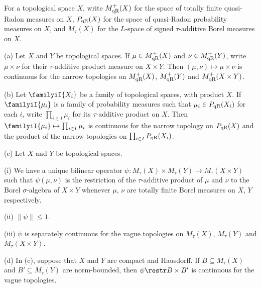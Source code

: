  For a topological space
$X$, write $M^+_{\text{qR}}(X)$ for the space of totally finite quasi-Radon
measures on $X$, $P_{\text{qR}}(X)$ for the space of quasi-Radon probability
measures on $X$, and $M_{\tau}(X)$ for the
$L$-space of signed $\tau$-additive Borel measures on $X$.

(a) Let $X$ and $Y$ be topological spaces.   If
$\mu\in M^+_{\text{qR}}(X)$ and $\nu\in M^+_{\text{qR}}(Y)$, write
$\mu\times\nu$ for their $\tau$-additive
product measure on $X\times Y$.
Then $(\mu,\nu)\mapsto\mu\times\nu$ is continuous for the narrow
topologies on $M^+_{\text{qR}}(X)$, $M^+_{\text{qR}}(Y)$ and $M^+_{\text{qR}}(X\times Y)$.

(b) Let $\familyiI{X_i}$ be a family of topological
spaces, with product $X$.   If $\familyiI{\mu_i}$ is a family of
probability measures such that $\mu_i\in P_{\text{qR}}(X_i)$ for each
$i$, write $\prod_{i\in I}\mu_i$ for its
$\tau$-additive product on $X$.   Then
$\familyiI{\mu_i}\mapsto\prod_{i\in I}\mu_i$ is continuous for the
narrow topology on $P_{\text{qR}}(X)$ and the product of the narrow
topologies on $\prod_{i\in I}P_{\text{qR}}(X_i)$.

(c) Let $X$ and $Y$ be topological spaces.

\quad(i) We have a unique bilinear operator
$\psi:M_{\tau}(X)\times M_{\tau}(Y)\to M_{\tau}(X\times Y)$
such that $\psi(\mu,\nu)$ is the restriction of the $\tau$-additive product
of $\mu$ and $\nu$ to the
Borel $\sigma$-algebra of $X\times Y$ whenever $\mu$, $\nu$ are totally
finite Borel measures on $X$, $Y$ respectively.

\quad(ii) $\|\psi\|\le 1$.

\quad(iii) $\psi$ is separately continuous for the vague topologies on
$M_{\tau}(X)$, $M_{\tau}(Y)$ and $M_{\tau}(X\times Y)$.

(d) In (c), suppose that $X$ and $Y$ are compact and Hausdorff.
If $B\subseteq M_{\tau}(X)$ and $B'\subseteq M_{\tau}(Y)$ are
norm-bounded, then $\psi\restr B\times B'$ is continuous for the vague
topologies.

